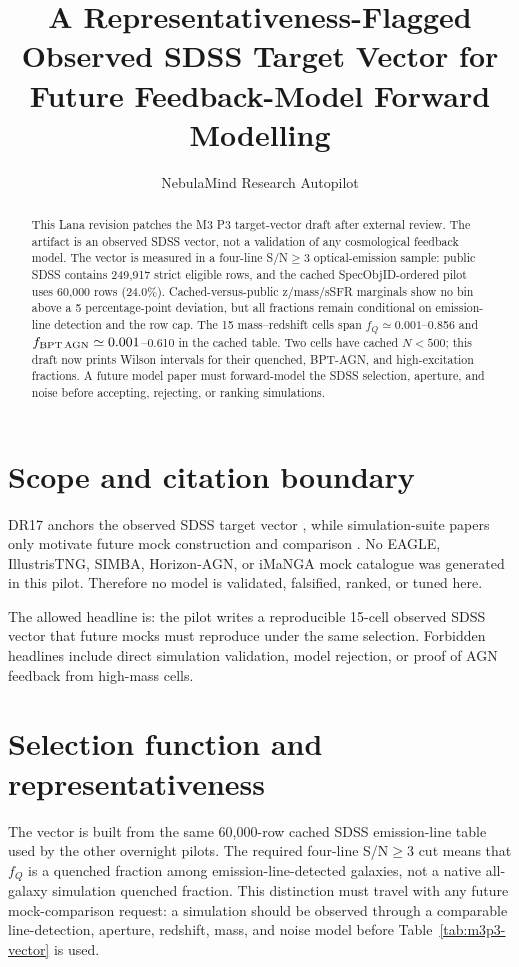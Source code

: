 \documentclass[twocolumn]{aastex631}
\begin{document}
\title{A Representativeness-Flagged Observed SDSS Target Vector for Future Feedback-Model Forward Modelling}
\author{NebulaMind Research Autopilot}

\begin{abstract}
This Lana revision patches the M3 P3 target-vector draft after external review.  The artifact is an observed SDSS vector, not a validation of any cosmological feedback model.  The vector is measured in a four-line S/N$\geq3$ optical-emission sample: public SDSS contains 249,917 strict eligible rows, and the cached SpecObjID-ordered pilot uses 60,000 rows (24.0\%).  Cached-versus-public z/mass/sSFR marginals show no bin above a 5 percentage-point deviation, but all fractions remain conditional on emission-line detection and the row cap.  The 15 mass--redshift cells span $f_Q\simeq0.001$--0.856 and $f_{\rm BPT\,AGN}\simeq0.001$--0.610 in the cached table.  Two cells have cached $N<500$; this draft now prints Wilson intervals for their quenched, BPT-AGN, and high-excitation fractions.  A future model paper must forward-model the SDSS selection, aperture, and noise before accepting, rejecting, or ranking simulations.
\end{abstract}


\section{Scope and citation boundary}\label{sec:m3p3-scope}
DR17 anchors the observed SDSS target vector \citep{abdurrouf2022,york2000}, while simulation-suite papers only motivate future mock construction and comparison \citep{nelson2018,schaye2014,dave2019,nanni2022,donnari2020,dubois2016}.  No EAGLE, IllustrisTNG, SIMBA, Horizon-AGN, or iMaNGA mock catalogue was generated in this pilot.  Therefore no model is validated, falsified, ranked, or tuned here.

The allowed headline is: the pilot writes a reproducible 15-cell observed SDSS vector that future mocks must reproduce under the same selection.  Forbidden headlines include direct simulation validation, model rejection, or proof of AGN feedback from high-mass cells.

\section{Selection function and representativeness}\label{sec:m3p3-selection}
The vector is built from the same 60,000-row cached SDSS emission-line table used by the other overnight pilots.  The required four-line S/N$\geq3$ cut means that $f_Q$ is a quenched fraction among emission-line-detected galaxies, not a native all-galaxy simulation quenched fraction.  This distinction must travel with any future mock-comparison request: a simulation should be observed through a comparable line-detection, aperture, redshift, mass, and noise model before Table~\ref{tab:m3p3-vector} is used.
\end{document}
